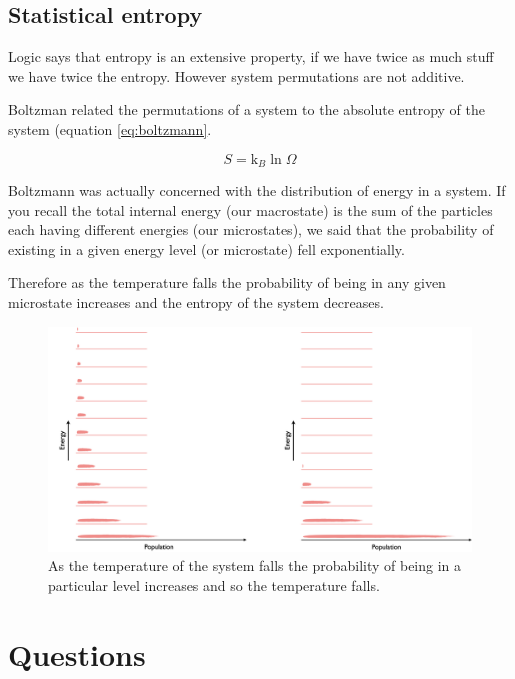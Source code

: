 \documentclass[
]{book}
\begin{document}
\hypertarget{statistical-entropy}{%
\subsection{Statistical entropy}\label{statistical-entropy}}

Logic says that entropy is an extensive property, if we have twice as much stuff we have twice the entropy. However system permutations are not additive.

Boltzman related the permutations of a system to the absolute entropy of the system (equation \eqref{eq:boltzmann}.

\begin{equation}
S=\textrm{k}_B \ln \Omega
\label{eq:boltzmann}
\end{equation}

Boltzmann was actually concerned with the distribution of energy in a system. If you recall the total internal energy (our macrostate) is the sum of the particles each having different energies (our microstates), we said that the probability of existing in a given energy level (or microstate) fell exponentially.

Therefore as the temperature falls the probability of being in any given microstate increases and the entropy of the system decreases.

\begin{figure}

{\centering \includegraphics[width=0.5\linewidth]{images/tempentropy} 

}

\caption{As the temperature of the system falls the probability of being in a particular level increases and so the temperature falls.}\label{fig:tempentropy}
\end{figure}

\hypertarget{sec:w3p1question}{%
\section{Questions}\label{sec:w3p1question}}
\end{document}
